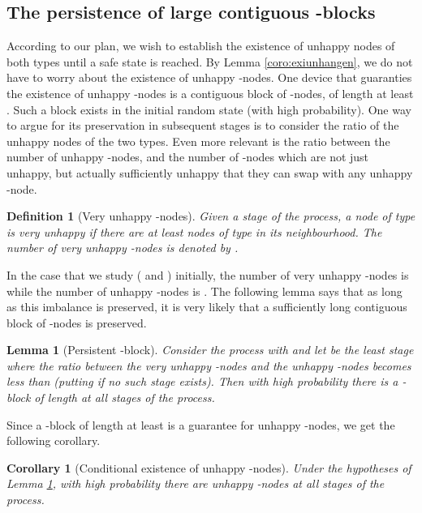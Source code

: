 \documentclass[11pt]{article}
\theoremstyle{plain}
\newtheorem{lem}[thm]{Lemma}
\newtheorem{coro}[thm]{Corollary}
\newtheorem{defi}[thm]{Definition}
\numberwithin{equation}{subsection}
\begin{document}
\subsection{The persistence of large contiguous \texorpdfstring{}{beta}-blocks}\label{se:persist}
According to our plan, we wish to establish the existence of unhappy nodes of both types until a safe state is reached.
By Lemma \ref{coro:exiunhangen}, we do not have to worry about the existence of unhappy -nodes. One device that guaranties the  existence of
unhappy -nodes is a contiguous block of -nodes, of length at least . 
Such a block exists in the initial random state (with high probability). One way to argue for its preservation in subsequent stages is to consider the 
ratio of the unhappy nodes of the two types. 
Even more relevant is the ratio between the number of unhappy -nodes, 
and the number of -nodes which are not just unhappy, but actually sufficiently unhappy that they can swap with any unhappy -node.

\begin{defi}[Very unhappy -nodes]\label{de:veryunhapy}
Given a stage of the process, a node of type  is very unhappy if
there are at least  nodes of type  in its neighbourhood.
The number of very unhappy -nodes is denoted by .
\end{defi}

In the case that we study ( and  ) 
initially, the number of very unhappy -nodes is  while the
number of unhappy -nodes is .
The following lemma says that as long as this imbalance is preserved, it is very likely that a
sufficiently long contiguous block of -nodes is preserved.
\begin{lem}[Persistent \texorpdfstring{}{beta}-block]
\label{le:persistb}
Consider the process
 with   
and let  be the least stage where
the ratio between the very unhappy -nodes and the unhappy -nodes
becomes less than  (putting  if no such stage exists). Then with 
high probability there is a -block of length  at all
stages  of the process. 
\end{lem}

Since a -block of length at least  is a
guarantee for unhappy -nodes, we get the following corollary.

\begin{coro}[Conditional existence of unhappy -nodes]\label{le:percosistb}
Under the hypotheses of Lemma \ref{le:persistb}, 
with high probability 
there are unhappy -nodes at 
all stages  of the process.
\end{coro}
\end{document}
